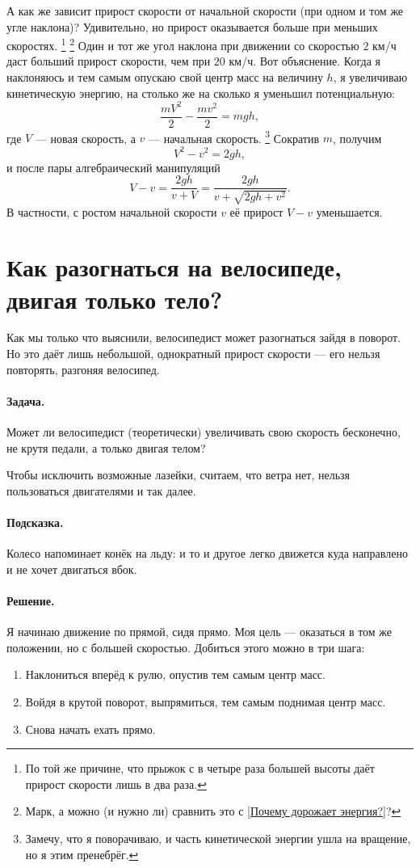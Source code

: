 А как же зависит прирост скорости от начальной скорости (при одном и том же угле наклона)?
Удивительно, но прирост оказывается больше при меньших скоростях.%
\footnote{По той же причине, что прыжок с в четыре раза большей высоты даёт прирост скорости лишь в два раза.}%
\footnote{Марк, а можно (и нужно ли) сравнить это с \ref{Почему дорожает энергия?}?\pr}
Один и тот же угол наклона при движении со скоростью $2$ км/ч даст больший прирост скорости, чем при $20$ км/ч.
Вот объяснение.
Когда я наклоняюсь и тем самым опускаю свой центр масс на
величину $h$, я увеличиваю кинетическую энергию, на столько же на сколько я уменьшил потенциальную:
\[
\frac{mV^2}2 - \frac{mv^2}2 = mgh,
\]
где $V$ — новая скорость, а $v$ — начальная скорость.%
\footnote{Замечу, что я поворачиваю, и часть кинетической энергии ушла на вращение, но я этим пренебрёг.}
Сократив $m$, получим
\[
V^2 - v^2 = 2gh,\]
и после пары алгебраический манипуляций
\[V - v=\frac{2gh}{v+V}=\frac{2gh}{v+\sqrt{2gh+v^2}}.\]
В частности,
с ростом начальной скорости $v$
её прирост $V - v$ уменьшается.

\section{Как разогнаться на велосипеде, двигая только тело?}\label{Как разогнаться на велосипеде, двигая только тело?}

Как мы только что выяснили, велосипедист может разогнаться зайдя в поворот.
Но это даёт лишь небольшой, однократный прирост скорости --- его нельзя повторять, разгоняя велосипед.

\paragraph{Задача.}
Может ли велосипедист (теоретически) увеличивать свою скорость бесконечно, не крутя педали, а только двигая телом?

Чтобы исключить возможные лазейки, считаем, что ветра нет, нельзя пользоваться двигателями и так далее.

\paragraph{Подсказка.}
Колесо напоминает конёк на льду: и то и другое легко движется куда направлено и не хочет двигаться вбок.

\paragraph{Решение.}
Я начинаю движение по прямой, сидя прямо.
Моя цель — оказаться в том же положении, но с большей скоростью.
Добиться этого можно в три шага:
\begin{enumerate}
\item Наклониться вперёд к рулю, опустив тем самым центр масс.
\item Войдя в крутой поворот, выпрямиться, тем самым поднимая центр масс.
\item Снова начать ехать прямо.
\end{enumerate}

